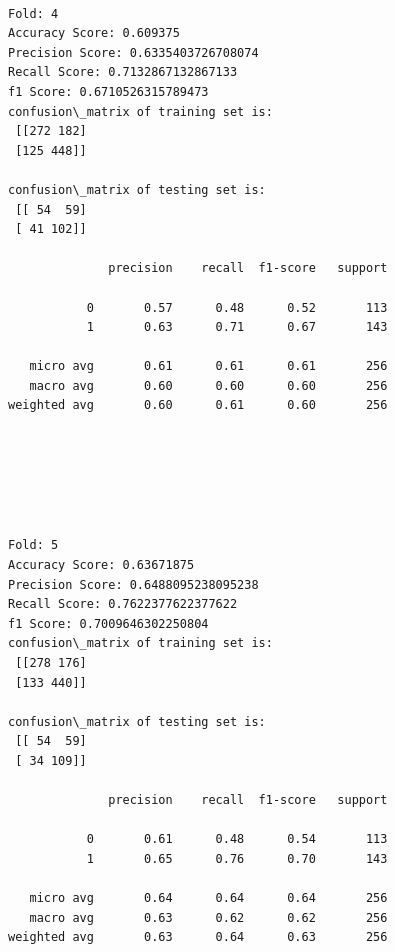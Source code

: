 \documentclass[11pt]{article}
\begin{document}
    \begin{Verbatim}[commandchars=\\\{\}]

Fold: 4
Accuracy Score: 0.609375
Precision Score: 0.6335403726708074
Recall Score: 0.7132867132867133
f1 Score: 0.6710526315789473
confusion\_matrix of training set is: 
 [[272 182]
 [125 448]] 

confusion\_matrix of testing set is: 
 [[ 54  59]
 [ 41 102]] 

              precision    recall  f1-score   support

           0       0.57      0.48      0.52       113
           1       0.63      0.71      0.67       143

   micro avg       0.61      0.61      0.61       256
   macro avg       0.60      0.60      0.60       256
weighted avg       0.60      0.61      0.60       256


    \end{Verbatim}

    \begin{center}
    \end{center}
    { \hspace*{\fill} \\}
    
    \begin{center}
    \end{center}
    { \hspace*{\fill} \\}
    
    \begin{Verbatim}[commandchars=\\\{\}]

Fold: 5
Accuracy Score: 0.63671875
Precision Score: 0.6488095238095238
Recall Score: 0.7622377622377622
f1 Score: 0.7009646302250804
confusion\_matrix of training set is: 
 [[278 176]
 [133 440]] 

confusion\_matrix of testing set is: 
 [[ 54  59]
 [ 34 109]] 

              precision    recall  f1-score   support

           0       0.61      0.48      0.54       113
           1       0.65      0.76      0.70       143

   micro avg       0.64      0.64      0.64       256
   macro avg       0.63      0.62      0.62       256
weighted avg       0.63      0.64      0.63       256


    \end{Verbatim}
\end{document}
